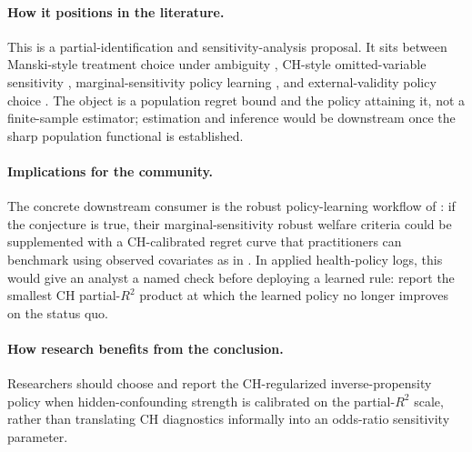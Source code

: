 \documentclass[11pt]{article}
\theoremstyle{definition}
\theoremstyle{plain}
\theoremstyle{remark}
\begin{document}
\paragraph{How it positions in the literature.}
This is a partial-identification and sensitivity-analysis proposal. It sits between Manski-style treatment choice under ambiguity \citep{Manski2004,Stoye2012}, CH-style omitted-variable sensitivity \citep{CinelliHazlett2020}, marginal-sensitivity policy learning \citep{KallusZhou2021,JinXuZhengZhou2025}, and external-validity policy choice \citep{AdjahoChristensen2025}. The object is a population regret bound and the policy attaining it, not a finite-sample estimator; estimation and inference would be downstream once the sharp population functional is established.

\paragraph{Implications for the community.}
The concrete downstream consumer is the robust policy-learning workflow of \citet{JinXuZhengZhou2025}: if the conjecture is true, their marginal-sensitivity robust welfare criteria could be supplemented with a CH-calibrated regret curve that practitioners can benchmark using observed covariates as in \citet{CinelliHazlett2020}. In applied health-policy logs, this would give an analyst a named check before deploying a learned rule: report the smallest CH partial-$R^2$ product at which the learned policy no longer improves on the status quo.

\paragraph{How research benefits from the conclusion.}
Researchers should choose and report the CH-regularized inverse-propensity policy when hidden-confounding strength is calibrated on the partial-$R^2$ scale, rather than translating CH diagnostics informally into an odds-ratio sensitivity parameter.
\end{document}
